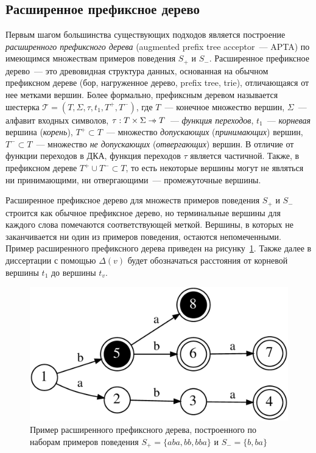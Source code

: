\subsection{Расширенное префиксное дерево}
\label{sec:review:sat-dfa-inf:apta}


Первым шагом большинства существующих подходов является построение \emph{расширенного префиксного дерева} (augmented prefix tree acceptor~{---} APTA) по имеющимся множествам примеров поведения $S_{+}$ и $S_{-}$. 
Расширенное префиксное дерево~--- это древовидная структура данных, основанная на обычном префиксном дереве (бор, нагруженное дерево, prefix tree, trie), отличающаяся от нее метками вершин.
Более формально, префиксным деревом называется шестерка $\mathcal{T} = \left(T,\Sigma,\tau,t_{1},T^{+}, T^{-}\right)$, где $T$~{---} конечное множество вершин, $\Sigma$~{---} алфавит входных символов, $\tau: T \times \Sigma \pto T$~{---} \emph{функция переходов}, $t_{1}$~{---} \emph{корневая} вершина (\emph{корень}), $T^{+} \subset T$~{---} множество \emph{допускающих} (\emph{принимающих}) вершин, $T^{-} \subset T$~{---} множество \emph{не допускающих} (\emph{отвергающих}) вершин.
В отличие от функции переходов в ДКА, функция переходов $\tau$ является частичной. 
Также, в префиксном дереве $T^{+} \cup T^{-} \subset T$, то есть некоторые вершины могут не являться ни принимающими, ни отвергающими~--- промежуточные вершины.

Расширенное префиксное дерево для множеств примеров поведения $S_{+}$ и $S_{-}$ строится как обычное префиксное дерево, но терминальные вершины для каждого слова помечаются соответствующей меткой. Вершины, в которых не заканчивается ни один из примеров поведения, остаются непомеченными. Пример расширенного префиксного дерева приведен на рисунку~\ref{img:apta-ex}.
Также далее в диссертации с помощью $\Delta(v)$ будет обозначаться расстояния от корневой вершины $t_{1}$ до вершины $t_{v}$.

\begin{figure}[ht]
  \centering
  \includegraphics[scale=0.14]{img/datamod/FIG2a.eps}
  \caption{Пример расширенного префиксного дерева, построенного по наборам примеров поведения $S_{+} = \{aba, bb, bba\}$ и $S_{-} = \{b, ba\}$}
  \label{img:apta-ex}
\end{figure}

